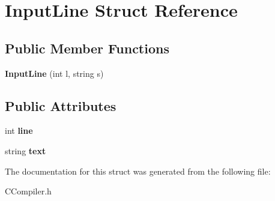\hypertarget{structInputLine}{\section{Input\-Line Struct Reference}
\label{structInputLine}
}
\subsection*{Public Member Functions}
\begin{DoxyCompactItemize}
\item 
\hypertarget{structInputLine_a6a57eafd6e53ea99651327e174c52077}{{\bfseries Input\-Line} (int l, string s)}\label{structInputLine_a6a57eafd6e53ea99651327e174c52077}

\end{DoxyCompactItemize}
\subsection*{Public Attributes}
\begin{DoxyCompactItemize}
\item 
\hypertarget{structInputLine_aef26343331dc90be48f6fdbf4ab85276}{int {\bfseries line}}\label{structInputLine_aef26343331dc90be48f6fdbf4ab85276}

\item 
\hypertarget{structInputLine_aa448799cf6fd6735d55c2cadb394e16f}{string {\bfseries text}}\label{structInputLine_aa448799cf6fd6735d55c2cadb394e16f}

\end{DoxyCompactItemize}


The documentation for this struct was generated from the following file\-:\begin{DoxyCompactItemize}
\item 
C\-Compiler.\-h\end{DoxyCompactItemize}
